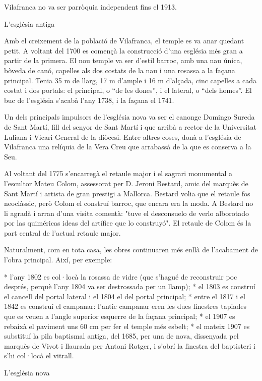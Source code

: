 Vilafranca no va ser parròquia independent fins el 1913.


L'església antiga

Amb el creixement de la població de Vilafranca, el temple es va anar quedant petit. A voltant del 1700 es començà la construcció d'una església més gran a partir de la primera. El nou temple va ser d'estil barroc, amb una nau única, bòveda de canó, capelles als dos costats de la nau i una rosassa a la façana principal. Tenia 35 m de llarg, 17 m d'ample i 16 m d'alçada, cinc capelles a cada costat  i dos portals: el principal, o ``de les dones'', i el lateral, o ``dels homes''. El buc de l'església s'acabà l'any 1738, i  la façana el 1741. 

Un dels principals impulsors de l'església nova va ser el canonge Domingo Sureda de Sant Martí, fill del senyor de Sant Martí i que arribà a rector de la Universitat Luliana i Vicari General de la diòcesi. Entre altres coses, donà a l'església de Vilafranca una relíquia de la Vera Creu que arrabassà de la que es conserva a la Seu. 

Al voltant del 1775 s'encarregà el retaule major i el sagrari monumental a l'escultor Mateu Colom, assessorat per D. Jeroni Bestard, amic del marquès de Sant Martí i artista de gran prestigi a Mallorca. Bestard volia que el retaule fos neoclàssic, però Colom el construí barroc, que encara era la moda. A Bestard no li agradà i arran d'una visita comentà: "tuve el desconsuelo de verlo alborotado por las quiméricas ideas del artífice que lo construyó". El  retaule de Colom és la part central de l'actual retaule major.

Naturalment, com en tota casa, les obres continuaren més enllà de l'acabament de l'obra principal. Així, per exemple:

* l'any 1802 es col·locà la rosassa de vidre (que s'hagué de reconstruir poc després, perquè l'any 1804 va ser destrossada per un llamp);
* el 1803 es construí el cancell del portal lateral i el 1804 el del portal principal;
* entre el 1817 i el 1842 es construí el campanar: l'antic campanar eren les dues finestres tapiades que es veuen a l'angle superior esquerre de la façana principal;
* el 1907 es rebaixà el paviment uns 60 cm per fer el temple més esbelt;
* el mateix 1907 es substituí la pila baptismal antiga, del 1685, per una de nova, dissenyada pel marquès de Vivot  i llaurada per Antoni Rotger, i s'obrí la finestra del baptisteri i s'hi col·locà el  vitrall.

L'església nova

